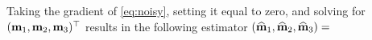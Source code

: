 \documentclass[11pt]{article}
\newcommand{\bfF}	{{\bf{F}}}
\newcommand{\bfI}	{{\bf{I}}}
\newcommand{\bfQ}	{{\bf{Q}}}
\newcommand{\bfT}	{{\bf{T}}}
\newcommand{\bfW}	{{\bf{W}}}
\newcommand{\bfd}	{{\bf{d}}}
\newcommand{\bfm}	{{\bf{m}}}
\newcommand{\bfmhat}    {{\widehat{\bfm}}}
\newcommand {\zero}  { {\bf 0} }
\renewcommand{\bfmhat}	{\widehat{\bf m}}
\begin{document}
{Taking the gradient of \eqref{eq:noisy},
 setting it equal to zero, and solving for $(\bfm_1,  \bfm_2, \bfm_3)^{\top} $ results in the following estimator $(\bfmhat_1,\bfmhat_2, \bfmhat_3) = $ 
\begin{eqnarray}
\nonumber

\end{eqnarray}}
\end{document}
